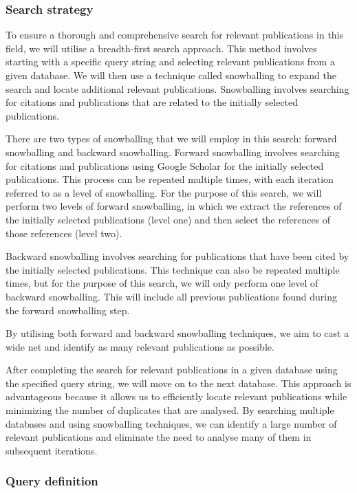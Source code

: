 \documentclass[conference]{IEEEtran}
\begin{document}
\subsubsection{Search strategy}

To ensure a thorough and comprehensive search for relevant publications in this
field, we will utilise a breadth-first search approach. This method involves
starting with a specific query string and selecting relevant publications from
a given database. We will then use a technique called snowballing to expand the
search and locate additional relevant publications. Snowballing involves
searching for citations and publications that are related to the initially
selected publications.

There are two types of snowballing that we will employ in this search: forward
snowballing and backward snowballing. Forward snowballing involves searching
for citations and publications using Google Scholar for the initially selected
publications. This process can be repeated multiple times, with each iteration
referred to as a level of snowballing. For the purpose of this search, we will
perform two levels of forward snowballing, in which we extract the references
of the initially selected publications (level one) and then select the
references of those references (level two).

Backward snowballing involves searching for publications that have been cited
by the initially selected publications. This technique can also be repeated
multiple times, but for the purpose of this search, we will only perform one
level of backward snowballing. This will include all previous publications
found during the forward snowballing step.

By utilising both forward and backward snowballing techniques, we aim to cast a
wide net and identify as many relevant publications as possible.

After completing the search for relevant publications in a given database using
the specified query string, we will move on to the next database. This approach
is advantageous because it allows us to efficiently locate relevant
publications while minimizing the number of duplicates that are analysed. By
searching multiple databases and using snowballing techniques, we can identify
a large number of relevant publications and eliminate the need to analyse many
of them in subsequent iterations.

\subsubsection{Query definition}
\end{document}

